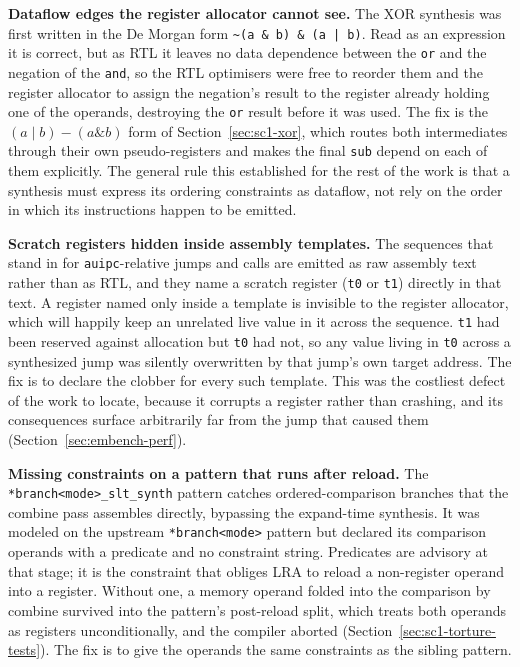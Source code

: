 \textbf{Dataflow edges the register allocator cannot see.} The XOR synthesis was first written in the
De Morgan form \texttt{\textasciitilde(a \& b) \& (a | b)}. Read as an expression it is correct, but
as RTL it leaves no data dependence between the \texttt{or} and the negation of the \texttt{and}, so
the RTL optimisers were free to reorder them and the register allocator to assign the negation's
result to the register already holding one of the operands, destroying the \texttt{or} result before
it was used. The fix is the $(a \mid b) - (a \mathbin{\&} b)$ form of Section~\ref{sec:sc1-xor}, which
routes both intermediates through their own pseudo-registers and makes the final \texttt{sub} depend
on each of them explicitly. The general rule this established for the rest of the work is that a
synthesis must express its ordering constraints as dataflow, not rely on the order in which its
instructions happen to be emitted.

\textbf{Scratch registers hidden inside assembly templates.} The sequences that stand in for
\texttt{auipc}-relative jumps and calls are emitted as raw assembly text rather than as RTL, and they
name a scratch register (\texttt{t0} or \texttt{t1}) directly in that text. A register named only
inside a template is invisible to the register allocator, which will happily keep an unrelated live
value in it across the sequence. \texttt{t1} had been reserved against allocation but \texttt{t0} had
not, so any value living in \texttt{t0} across a synthesized jump was silently overwritten by that
jump's own target address. The fix is to declare the clobber for every such template. This was the
costliest defect of the work to locate, because it corrupts a register rather than crashing, and its
consequences surface arbitrarily far from the jump that caused them
(Section~\ref{sec:embench-perf}).

\textbf{Missing constraints on a pattern that runs after reload.} The
\texttt{*branch<mode>\_slt\_synth} pattern catches ordered-comparison branches that the combine pass
assembles directly, bypassing the expand-time synthesis. It was modeled on the upstream
\texttt{*branch<mode>} pattern but declared its comparison operands with a predicate and no constraint
string. Predicates are advisory at that stage; it is the constraint that obliges LRA to reload a
non-register operand into a register. Without one, a memory operand folded into the comparison by
combine survived into the pattern's post-reload split, which treats both operands as registers
unconditionally, and the compiler aborted (Section~\ref{sec:sc1-torture-tests}). The fix is to give
the operands the same constraints as the sibling pattern.

